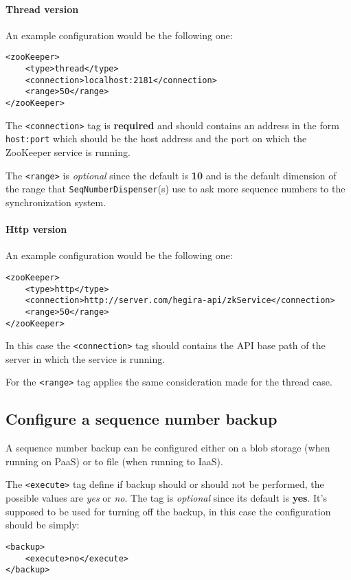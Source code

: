 \paragraph{Thread version} An example configuration would be the following one:
\begin{verbatim}
<zooKeeper>
    <type>thread</type>
    <connection>localhost:2181</connection>
    <range>50</range>
</zooKeeper>
\end{verbatim}

\noindent The \texttt{<connection>} tag is \textbf{required} and should contains an address in the form \texttt{host:port} which should be the host address and the port on which the ZooKeeper service is running.

\noindent The \texttt{<range>} is \textit{optional} since the default is \textbf{10} and is the default dimension of the range that \texttt{SeqNumberDispenser}(s) use to ask more sequence numbers to the synchronization system.

\paragraph{Http version} An example configuration would be the following one:
\begin{verbatim}
<zooKeeper>
    <type>http</type>
    <connection>http://server.com/hegira-api/zkService</connection>
    <range>50</range>
</zooKeeper>
\end{verbatim}

\noindent In this case the \texttt{<connection>} tag should contains the API base path of the server in which the service is running.

\noindent For the \texttt{<range>} tag applies the same consideration made for the thread case.
 
\subsection{Configure a sequence number backup}
A sequence number backup can be configured either on a blob storage (when running on PaaS) or to file (when running to IaaS).

\newparagraph  The \texttt{<execute>} tag define if backup should or should not be performed, the possible values are \textit{yes} or \textit{no}. The tag is \textit{optional} since its default is \textbf{yes}.
It's supposed to be used for turning off the backup, in this case the configuration should be simply:
\begin{verbatim}
<backup>
    <execute>no</execute>
</backup>
\end{verbatim}

